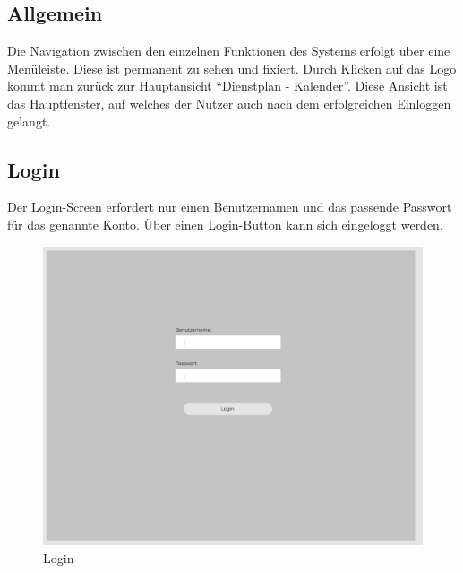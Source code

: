 \documentclass[11pt,
paper=a4,
bibtotocnumbered,	  %
liststotocnumbered,  %
DIV=calc,		  %
tablecaptionabove,	  %
headinclude,
]{article}
\begin{document}
\subsection{Allgemein}
Die Navigation zwischen den einzelnen Funktionen des Systems erfolgt über eine Menüleiste. Diese ist permanent zu sehen und fixiert. Durch Klicken auf das Logo kommt man zurück zur Hauptansicht “Dienstplan - Kalender”. Diese Ansicht ist das Hauptfenster, auf welches der Nutzer auch nach dem erfolgreichen Einloggen gelangt.
\subsection{Login}
Der Login-Screen erfordert nur einen Benutzernamen und das passende Passwort für das genannte Konto. Über einen Login-Button kann sich eingeloggt werden.
\begin{figure}[H]
\includegraphics[scale=1]{Bilder/Login.jpg}
\caption{Login}
\end{figure}\begin{figure}[H]

\end{figure}
\end{document}
